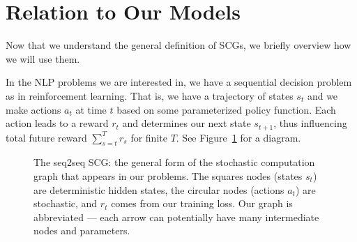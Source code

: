 \documentclass[12pt]{report}
\begin{document}




\section{Relation to Our Models}

Now that we understand the general definition of SCGs, we briefly overview how we will use them.


In the NLP problems we are interested in, we have a sequential decision problem as in reinforcement learning. That is, we have a trajectory of states $s_t$ and we make actions $a_t$ at time $t$ based on some parameterized policy function. Each action leads to a reward $r_t$ and determines our next state $s_{t+1}$, thus influencing total future reward $\sum_{s=t}^T r_s$ for finite $T$. See Figure~\ref{fig:our_scg} for a diagram.

\begin{figure}[t]
\begin{center}
\end{center}

\caption[Seq2Seq SCG]{The seq2seq SCG: the general form of the stochastic computation graph that appears in our problems. The squares nodes (states $s_t$) are deterministic hidden states, the circular nodes (actions $a_t$) are stochastic, and $r_t$ comes from our training loss. Our graph is abbreviated --- each arrow can potentially have many intermediate nodes and parameters. }
\label{fig:our_scg}
\end{figure}
\end{document}
